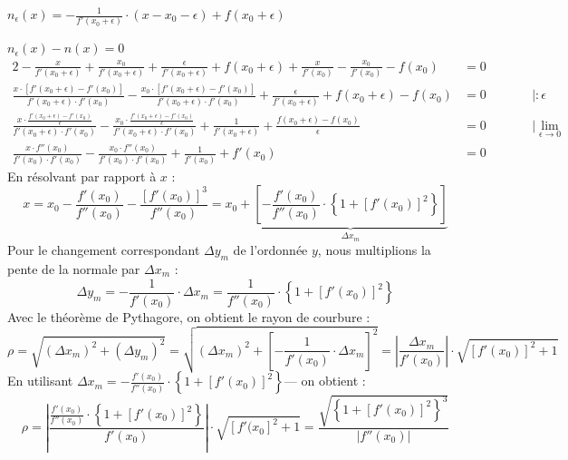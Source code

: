 \documentclass[11pt,english,BCOR=10mm,DIV=12,bibliography=totoc,parskip=false,headings=small,
    headinclude=false,footinclude=false,oneside]{pst-doc}
\newcommand{\envert}[1]{\left\lvert#1\right\rvert}
\let\abs=\envert
\newcommand{\BM}[1]{\ensuremath{\text{\boldmath $#1$\unboldmath}}}
\begin{document}
\makebox[7cm][l]{\textbf{Normale en \BM{x_{0}+\epsilon}:}} $ n_{\epsilon}(x)=-\frac{1}{f'(x_{0}+\epsilon)}\cdot (x-x_{0}-\epsilon)+f(x_{0}+\epsilon)$

 $n_{\epsilon}(x) - n(x) = 0$
\begin{alignat*}{2}
- \frac{x}{f'(x_{0}+\epsilon)} + \frac{x_{0}}{f'(x_{0}+\epsilon)} + \frac{\epsilon}{f'(x_{0}+\epsilon)} + f(x_{0}+\epsilon) + \frac{x}{f'(x_{0})} - \frac{x_{0}}{f'(x_{0})} - f(x_{0}) & = 0&\qquad& \\[4pt]
\frac{x\cdot \left[f'(x_{0}+\epsilon) - f'(x_{0})\right]}{f'(x_{0}+\epsilon)\cdot f'(x_{0})} - \frac{x_{0}\cdot \left[f'(x_{0}+\epsilon) - f'(x_{0})\right]}{f'(x_{0}+\epsilon)\cdot f'(x_{0})} + \frac{\epsilon}{f'(x_{0}+\epsilon)} + f(x_{0}+\epsilon) - f(x_{0}) & = 
0&\qquad& |:\epsilon\\[4pt]
\frac{x\cdot \frac{f'(x_{0}+\epsilon) - f'(x_{0})}{\epsilon}}{f'(x_{0}+\epsilon)\cdot f'(x_{0})} - \frac{x_{0}\cdot \frac{f'(x_{0}+\epsilon) - f'(x_{0})}{\epsilon}}{f'(x_{0}+\epsilon)\cdot f'(x_{0})} + \frac{1}{f'(x_{0}+\epsilon)} + \frac{f(x_{0}+\epsilon) - 
f(x_{0})}{\epsilon} & = 0&\qquad&| \lim_{\epsilon\to 0}\\[4pt]
\frac{x\cdot f''(x_{0})}{f'(x_{0})\cdot f'(x_{0})} - \frac{x_{0}\cdot f''(x_{0})}{f'(x_{0})\cdot f'(x_{0})} + \frac{1}{f'(x_{0})} + f'(x_{0}) & = 0&&
\end{alignat*}
En résolvant par rapport à $x$ :
\begin{equation*}
 x = x_{0} - \frac{f'(x_{0})}{f''(x_{0})} - \frac{\left[f'(x_{0})\right]^{3}}{f''(x_{0})} = x_{0} + \underbrace{\left[-\frac{f'(x_{0})}{f''(x_{0})}\cdot \left\{ 1 + \left[f'(x_{0})\right]^{2} \right\}\right]}_{\Delta x_{m}}
\end{equation*}
Pour le changement correspondant  $\Delta y_{m}$ de l'ordonnée $y$,  nous multiplions la pente de la normale par $\Delta x_{m}$ :
\begin{equation*}
  \Delta y_{m} = -\frac{1}{f'(x_{0})} \cdot \Delta x_{m} =\frac{1}{f''(x_{0})}\cdot \left\{ 1 + \left[f'(x_{0})\right]^{2} \right\}
\end{equation*}
Avec le théorème de Pythagore, on obtient le rayon de courbure :
\begin{equation*}
  \rho = \sqrt{(\Delta x_{m})^{2} + (\Delta y_{m})^{2}} = \sqrt{(\Delta x_{m})^{2} + \left[-\frac{1}{f'(x_{0})} \cdot \Delta x_{m}\right]^{2}} = \abs{\frac{\Delta x_{m}}{f'(x_{0})}} \cdot \sqrt{\left[f'(x_{0})\right]^{2} + 1}
\end{equation*}
En utilisant $\Delta x_{m} = -\frac{f'(x_{0})}{f''(x_{0})}\cdot \left\{ 1 + \left[f'(x_{0})\right]^{2} \right\}$--- on obtient :
\begin{equation*}
  \rho = \abs{\frac{\frac{f'(x_{0})}{f''(x_{0})}\cdot \left\{ 1 + \left[f'(x_{0})\right]^{2} \right\}}{f'(x_{0})}} \cdot \sqrt{\left[f'(x_{0}\right]^{2} + 1} =
  \frac{\sqrt{\left\{1 + \left[f'(x_{0})\right]^{2}\right\}^{3}}}{\abs{f''(x_{0})}}
\end{equation*}
\end{document}
